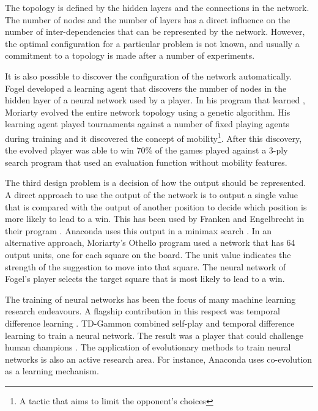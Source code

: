 The topology is defined by the hidden layers and the connections in the network.  The number of nodes and the number of layers has a direct influence on the number of inter-dependencies that can be represented by the network. However, the optimal configuration for a particular problem is not known, and usually a commitment to a topology is made after a number of experiments. 

It is also possible to discover the configuration of the network automatically. Fogel \cite{fogel:networks} developed a learning agent that discovers the number of nodes in the hidden layer of a neural network used by a  player. In his program that learned , Moriarty  \cite{moriarty:evolving} evolved the entire network topology using a genetic algorithm. His learning agent played tournaments against a number of fixed playing agents during training and it discovered the concept of mobility\footnote{A tactic that aims to limit the opponent's choices}.  After this discovery, the evolved player was able to win 70\% of the games played against a 3-ply search program that used an evaluation function without mobility features.   

The third design problem is a decision of how the output should be represented. A direct approach to use the output of the network is to output a single value that is compared with the output of another position to decide which position is more likely to lead to a win. This has been used by Franken and Engelbrecht in their  program \cite{franken:checkers}. Anaconda uses this output in a minimax search \cite{davis:evolve}. In an alternative approach, Moriarty's Othello program used a network that has 64 output units, one for each square on the board. The unit value indicates the strength of the suggestion to move into that square.  The neural network of Fogel's  player selects the target square that is most likely to lead to a win.

The training of neural networks has been the focus of many machine learning research endeavours.  A flagship contribution in this respect was temporal difference learning \cite{tesauro:learning}. TD-Gammon combined self-play and temporal difference learning to train a neural network.  The result was a  player that could challenge human champions \cite{schaeffer:games,tesauro:learning}.  The application of evolutionary methods to train neural networks is also an active research area.  For instance, Anaconda uses co-evolution as a learning mechanism.

